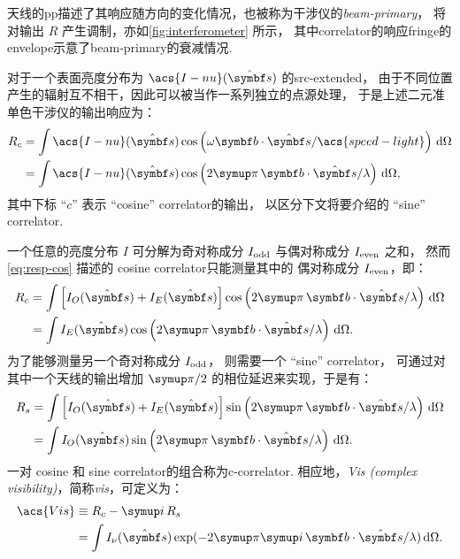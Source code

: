 天线的\ac{pp}描述了其响应随方向的变化情况，也被称为干涉仪的\emph{\acf{beam-primary}}，
将对输出 $R$ 产生调制，亦如\autoref{fig:interferometer} 所示，
其中\ac{correlator}的响应\ac{fringe}的\ac{envelope}示意了\ac{beam-primary}的衰减情况.

对于一个表面亮度分布为 $\acs{I-nu}(\hat{\B{s}})$ 的\ac{src-extended}，
由于不同位置产生的辐射互不相干，因此可以被当作一系列独立的点源处理，
于是上述二元准单色干涉仪的输出响应为：
\begin{align}
  R_c & = \int \acs{I-nu}(\hat{\B{s}})
      \cos \left( \omega \B{b}\cdot\hat{\B{s}} / \acs{speed-light} \right)
      \,\D{\Omega}  \\
    & = \int \acs{I-nu}(\hat{\B{s}}) \cos \left(
      2\Cpi\, \B{b}\cdot\hat{\B{s}} / \lambda \right) \,\D{\Omega},
    \label{eq:resp-cos}
\end{align}
其中下标 \enquote{$c$} 表示 \enquote{cosine} \ac{correlator}的输出，
以区分下文将要介绍的 \enquote{sine} \ac{correlator}.

一个任意的亮度分布 $I$ 可分解为奇对称成分 $I_{\mathrm{odd}}$
与偶对称成分 $I_{\mathrm{even}}$ 之和，
然而\autoref{eq:resp-cos} 描述的 cosine \ac{correlator}只能测量其中的
偶对称成分 $I_{\mathrm{even}}$，即：
\begin{align}
  R_c & = \int \left[ I_O(\hat{\B{s}}) + I_E(\hat{\B{s}}) \right]
      \cos \left( 2\Cpi\, \B{b}\cdot\hat{\B{s}} / \lambda \right)
      \,\D{\Omega}  \\
    & = \int I_E(\hat{\B{s}}) \cos \left(
      2\Cpi\, \B{b}\cdot\hat{\B{s}} / \lambda \right) \,\D{\Omega}.
\end{align}
为了能够测量另一个奇对称成分 $I_{\mathrm{odd}}$，
则需要一个 \enquote{sine} \ac{correlator}，
可通过对其中一个天线的输出增加 $\Cpi/2$ 的相位延迟来实现，于是有：
\begin{align}
  R_s & = \int \left[ I_O(\hat{\B{s}}) + I_E(\hat{\B{s}}) \right]
      \sin \left( 2\Cpi\, \B{b}\cdot\hat{\B{s}} / \lambda \right)
      \,\D{\Omega}  \\
    & = \int I_O(\hat{\B{s}}) \sin \left(
      2\Cpi\, \B{b}\cdot\hat{\B{s}} / \lambda \right) \,\D{\Omega}.
\end{align}
一对 cosine 和 sine \ac{correlator}的组合称为\ac{c-correlator}.
相应地，\emph{\acl{Vis} (complex visibility)}，简称\emph{\ac{vis}}，可定义为：
\begin{align}
  \acs{Vis}
    & \equiv R_c - \Ci\, R_s  \\
    & = \int I_{\nu}(\hat{\B{s}}) \exp
      (-2\Cpi\Ci\, \B{b}\cdot\hat{\B{s}} / \lambda) \,\D{\Omega}.
    \label{eq:vis}
\end{align}

